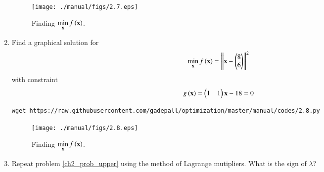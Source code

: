 \documentclass[journal,12pt,twocolumn]{IEEEtran}
\renewcommand\thesection{\arabic{section}}
\begin{document}
\begin{enumerate}[label=\thesection.\arabic*,ref=\thesection.\theenumi]
%
\begin{figure}[!ht]
\centering
\texttt{[image: ./manual/figs/2.7.eps]}
\caption{ Finding $ \displaystyle \min_{\mathbf{x}}f\left(\mathbf{x}\right)$.}
\label{fig.2.7}	
\end{figure}

%
\item
\label{ch2_prob_upper}
Find a graphical solution for 	 
	 \begin{align}
	 \label{ch2_second_min}
	\min_{\mbf{x}} f\brak{\mbf{x}} = \norm{\vec{x}-\myvec{8\\6}}^2
	 \end{align}
	 with constraint
	 \begin{align}
	 \label{ch2_second_const}
	 g\brak{\mbf{x}} = \myvec{1 & 1}\vec{x} - 18 = 0
	 \end{align}
	 
%
\solution
%	
\begin{lstlisting}
wget https://raw.githubusercontent.com/gadepall/optimization/master/manual/codes/2.8.py
\end{lstlisting}

%
\begin{figure}[!ht]
\centering
\texttt{[image: ./manual/figs/2.8.eps]}
\caption{ Finding $ \displaystyle \min_{\mathbf{x}}f\left(\mathbf{x}\right)$.}
\label{fig.2.8}	
\end{figure}
%
\item
Repeat problem \ref{ch2_prob_upper} using the method of Lagrange mutipliers.  What is the sign of $\lambda$?


\end{enumerate}
\end{document}
